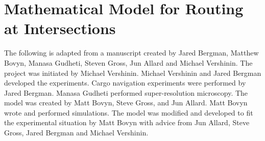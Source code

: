 




\chapter{Mathematical Model for Routing at Intersections} \label{sec:model}

The following is adapted from a manuscript created by Jared Bergman, Matthew Bovyn, Manasa Gudheti, Steven Gross, Jun Allard and Michael Vershinin. The project was initiated by Michael Vershinin. Michael Vershinin and Jared Bergman developed the experiments. Cargo navigation experiments were performed by Jared Bergman. Manasa Gudheti performed super-resolution microscopy. The model was created by Matt Bovyn, Steve Gross, and Jun Allard. Matt Bovyn wrote and performed simulations. The model was modified and developed to fit the experimental situation by Matt Bovyn with advice from Jun Allard, Steve Gross, Jared Bergman and Michael Vershinin.

